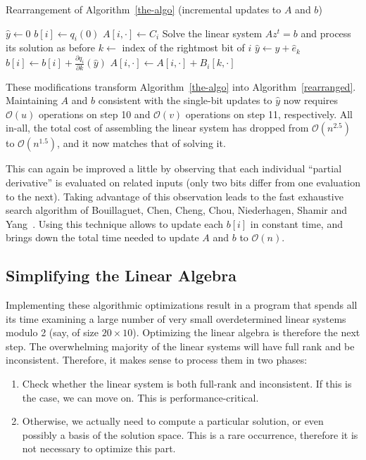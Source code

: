 \documentclass[twoside,leqno]{article}
\newcommand{\bigO}[1]{\ensuremath{\mathcal{O}\left( #1 \right)} }
\begin{document}
\begin{algorithm}
  \caption{\label{rearranged} Rearrangement of Algorithm~\ref{the-algo} (incremental updates to $A$ and $b$)}
\begin{algorithmic}[1]
  \State $\hat y \gets 0$ 
  \State $b[i] \gets  q_i(0)$
  \State $A[i, \cdot] \gets C_i$
  \EndFor
   
  \State Solve the linear system $Az^t = b$ and process its solution as before
  \State $k \gets $ index of the rightmost bit of $i$ 
  \State $\hat y \gets \hat y + \hat e_k$
   
  \State $b[i] \gets b[i] + \frac{\partial q_i}{\partial k}(\hat y)$
  \State $A[i, \cdot] \gets A[i, \cdot] + B_i[k, \cdot]$
  \EndFor
  \EndFor
\end{algorithmic}
\end{algorithm}

These modifications transform Algorithm~\ref{the-algo} into
Algorithm~\ref{rearranged}.  Maintaining $A$ and $b$ consistent with the
single-bit updates to $\hat y$ now requires $\bigO{u}$ operations on step 10 and
$\bigO{v}$ operations on step 11, respectively. All in-all, the total cost of
assembling the linear system has dropped from $\bigO{n^{2.5}}$ to
$\bigO{n^{1.5}}$, and it now matches that of solving it.

This can again be improved a little by observing that each individual ``partial
derivative'' is evaluated on related inputs (only two bits differ from one
evaluation to the next). Taking advantage of this observation leads to the fast
exhaustive search algorithm of Bouillaguet, Chen, Cheng, Chou, Niederhagen,
Shamir and Yang~\cite{BouillaguetCCCNSY10}. Using this technique allows to
update each $b[i]$ in constant time, and brings down the total time needed to
update $A$ and $b$ to $\bigO{n}$.

\subsection{Simplifying the Linear Algebra}

Implementing these algorithmic optimizations result in a program that spends all
its time examining a large number of very small overdetermined linear systems
modulo 2 (say, of size $20 \times 10$). Optimizing the linear algebra is
therefore the next step. The overwhelming majority of the linear systems will
have full rank and be inconsistent. Therefore, it makes sense to process them in
two phases:
\begin{enumerate}
\item Check whether the linear system is both full-rank and inconsistent. If
  this is the case, we can move on. This is performance-critical.

\item Otherwise, we actually need to compute a particular solution, or even
  possibly a basis of the solution space. This is a rare occurrence, therefore
  it is not necessary to optimize this part.
\end{enumerate}
\end{document}
